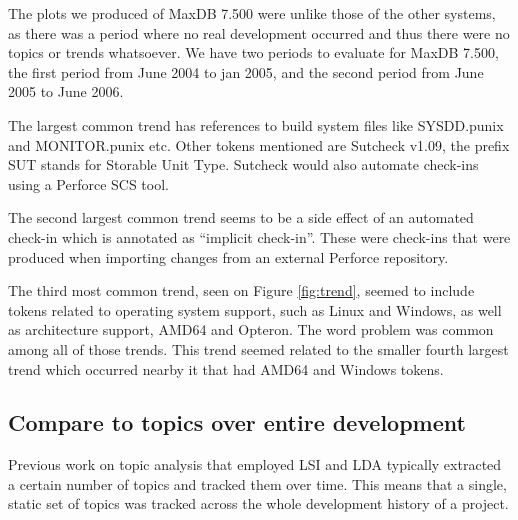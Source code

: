 \documentclass[times, 10pt,twocolumn]{article}
\begin{document}
The plots we produced of MaxDB 7.500 were 
unlike those of the other systems, as 
 there was a
period where no real development occurred and thus there were no topics or trends
whatsoever. We have two periods to evaluate for MaxDB 7.500, the first
period from June 2004 to jan 2005, and the second period from June
2005 to June 2006.

The largest common trend has references to build system files like
SYSDD.punix and MONITOR.punix etc. Other tokens mentioned are Sutcheck
v1.09, the prefix SUT stands for Storable Unit Type. Sutcheck would
also automate check-ins using a Perforce SCS tool.

The second largest common trend seems to be a side effect of an
automated check-in which is annotated as ``implicit check-in''. These
were check-ins that were produced when importing changes from an
external Perforce repository.

The third most common trend, seen on Figure \ref{fig:trend}, seemed to
include tokens related to operating system support, such as Linux and
Windows, as well as architecture support, AMD64 and Opteron. The word
problem was common among all of those trends. This trend seemed
related to the smaller fourth largest trend which occurred nearby it
that had AMD64 and Windows tokens.

\subsection{Compare to topics over entire development}





Previous work on topic analysis that employed LSI and LDA typically
extracted a certain number of topics and tracked them over time. This
means that a single, static set of topics was tracked across the whole
development history of a project. 
\end{document}

